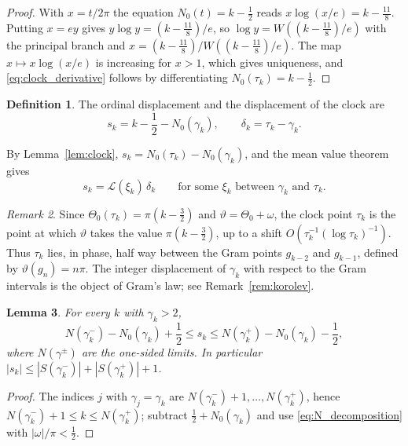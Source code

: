 \documentclass[11pt,reqno]{amsart}
\theoremstyle{plain}\newtheorem{theorem}{Theorem}[section]\newtheorem{proposition}[theorem]{Proposition}\newtheorem{lemma}[theorem]{Lemma}\newtheorem{corollary}[theorem]{Corollary}
\theoremstyle{definition}\newtheorem{hypothesis}[theorem]{Hypothesis}\newtheorem{definition}[theorem]{Definition}
\theoremstyle{remark}\newtheorem{remark}[theorem]{Remark}\newtheorem{experiment}[theorem]{Experiment}\newtheorem{question}[theorem]{Question}\newtheorem{heuristic}[theorem]{Heuristic}\newtheorem{conjecture}[theorem]{Conjecture}
\newcommand{\NO}{N_0}\newcommand{\lL}{\mathcal L}\newcommand{\IT}{\mathcal I_T}\newcommand{\R}{\mathbb R}\newcommand{\N}{\mathbb N}\newcommand{\eps}{\varepsilon}\newcommand{\sgn}{\operatorname{sgn}}
\begin{document}
\begin{proof}
With $x=t/2\pi$ the equation $\NO(t)=k-\frac12$ reads $x\log(x/e)=k-\frac{11}8$. Putting $x=ey$ gives $y\log y=(k-\frac{11}8)/e$, so $\log y=W((k-\frac{11}8)/e)$ with the principal branch \cite{Corless1996} and $x=(k-\frac{11}8)/W((k-\frac{11}8)/e)$. The map $x\mapsto x\log(x/e)$ is increasing for $x>1$, which gives uniqueness, and \eqref{eq:clock_derivative} follows by differentiating $\NO(\tau_k)=k-\frac12$.
\end{proof}

\begin{definition}\label{def:displacements}
The ordinal displacement and the displacement of the clock are
\begin{equation}
s_k=k-\frac12-\NO(\gamma_k),\qquad \delta_k=\tau_k-\gamma_k .
\label{eq:displacements}
\end{equation}
\end{definition}

By Lemma~\ref{lem:clock}, $s_k=\NO(\tau_k)-\NO(\gamma_k)$, and the mean value theorem gives
\begin{equation}
s_k=\lL(\xi_k)\,\delta_k\qquad\text{for some }\xi_k\text{ between }\gamma_k\text{ and }\tau_k .
\label{eq:s_delta}
\end{equation}

\begin{remark}\label{rem:gram_points}
Since $\Theta_0(\tau_k)=\pi(k-\frac32)$ and $\vartheta=\Theta_0+\omega$, the clock point $\tau_k$ is the point at which $\vartheta$ takes the value $\pi(k-\frac32)$, up to a shift $O(\tau_k^{-1}(\log\tau_k)^{-1})$. Thus $\tau_k$ lies, in phase, half way between the Gram points $g_{k-2}$ and $g_{k-1}$, defined by $\vartheta(g_n)=n\pi$. The integer displacement of $\gamma_k$ with respect to the Gram intervals is the object of Gram's law; see Remark~\ref{rem:korolev}.
\end{remark}

\begin{lemma}\label{lem:s_bounds}
For every $k$ with $\gamma_k>2$,
\begin{equation}
N(\gamma_k^-)-\NO(\gamma_k)+\frac12\le s_k\le N(\gamma_k^+)-\NO(\gamma_k)-\frac12,
\label{eq:s_bounds}
\end{equation}
where $N(\gamma^\pm)$ are the one-sided limits. In particular $|s_k|\le|S(\gamma_k^-)|+|S(\gamma_k^+)|+1$.
\end{lemma}

\begin{proof}
The indices $j$ with $\gamma_j=\gamma_k$ are $N(\gamma_k^-)+1,\dots,N(\gamma_k^+)$, hence $N(\gamma_k^-)+1\le k\le N(\gamma_k^+)$; subtract $\frac12+\NO(\gamma_k)$ and use \eqref{eq:N_decomposition} with $|\omega|/\pi<\frac12$.
\end{proof}
\end{document}
